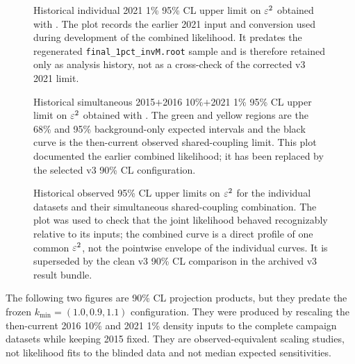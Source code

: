 \begin{figure}[p]
\centering
{}
\caption{Historical individual 2021 1\% 95\% CL upper limit on $\varepsilon^2$ obtained
with \CLs{}. The plot records the earlier 2021 input and conversion used during
development of the combined likelihood. It predates the regenerated
\texttt{final\_1pct\_invM.root} sample and is therefore retained only as analysis history,
not as a cross-check of the corrected v3 2021 limit.}
\label{fig:app-legacy-95-individual-2021}
\end{figure}

\begin{figure}[p]
\centering
{}
\caption{Historical simultaneous 2015$+$2016 10\%$+$2021 1\% 95\% CL upper limit
on $\varepsilon^2$ obtained with \CLs{}. The green and yellow regions are the 68\% and 95\%
background-only expected intervals and the black curve is the then-current observed
shared-coupling limit. This plot documented the earlier combined likelihood; it has
been replaced by the selected v3 90\% CL configuration.}
\label{fig:app-legacy-95-combined}
\end{figure}

\begin{figure}[p]
\centering
{}
\caption{Historical observed 95\% CL upper limits on $\varepsilon^2$ for the individual
datasets and their simultaneous shared-coupling combination. The plot was used to
check that the joint likelihood behaved recognizably relative to its inputs; the
combined curve is a direct profile of one common $\varepsilon^2$, not the pointwise envelope
of the individual curves. It is superseded by the clean v3 90\% CL comparison in the
archived v3 result bundle.}
\label{fig:app-legacy-95-observed-overlay}
\end{figure}

The following two figures are 90\% CL projection products, but they predate the frozen
$k_{\min}=(1.0,0.9,1.1)$ configuration. They were produced by rescaling the then-current
2016 10\% and 2021 1\% density inputs to the complete campaign datasets while keeping
2015 fixed. They are observed-equivalent scaling studies, not likelihood fits to the
blinded data and not median expected sensitivities.

